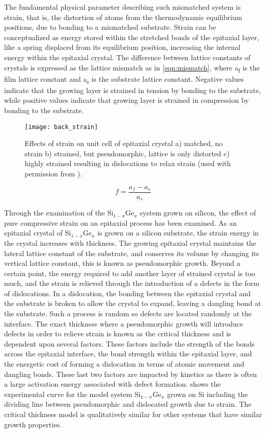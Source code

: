 The fundamental physical parameter describing such mismatched system is strain, that is, the distortion of atoms from the thermodynamic equilibrium positions, due to bonding to a mismatched substrate.
Strain can be conceptualized as energy stored within the stretched bonds of the epitaxial layer, like a spring displaced from its equilibrium position, increasing the internal energy within the epitaxial crystal. The difference between lattice constants of crystals is expressed as the lattice mismatch as in \cref{eqn:mismatch}, where a\textsubscript{f} is the film lattice constant and a\textsubscript{s} is the substrate lattice constant.
Negative values indicate that the growing layer is strained in tension by bonding to the substrate, while positive values indicate that growing layer is strained in compression by bonding to the substrate.
\begin{figure}
 \centering \texttt{[image: back\_strain]}
 \caption[Unit cell strain visualization]{\label{fig:back_strain}Effects of strain on unit cell of epitaxial crystal a) matched, no strain b) strained, but pseudomorphic, lattice is only distorted c) highly strained resulting in dislocations to relax strain (used with permission from \cite{ohring2001materials}).}
\end{figure}
\begin{equation}
    f = \frac{a_f - a_s}{a_s} \label{eqn:mismatch}
\end{equation}

Through the examination of the Si\(_{1-x}\)Ge\(_x\) system grown on silicon, the effect of pure compressive strain on an epitaxial process has been examined.
As an epitaxial crystal of Si\(_{1-x}\)Ge\(_x\) is grown on a silicon substrate, the strain energy in the crystal increases with thickness.
The growing epitaxial crystal maintains the lateral lattice constant of the substrate, and conserves its volume by changing its vertical lattice constant, this is known as pseudomorphic growth.
Beyond a certain point, the energy required to add another layer of strained crystal is too much, and the strain is relieved through the introduction of a defects in the form of dislocations.
In a dislocation, the bonding between the epitaxial crystal and the substrate is broken to allow the crystal to expand, leaving a dangling bond at the substrate.
Such a process is random so defects are located randomly at the interface.
The exact thickness where a pseudomorphic growth will introduce defects in order to relieve strain is known as the critical thickness and is dependent upon several factors.
These factors include the strength of the bonds across the epitaxial interface, the bond strength within the epitaxial layer, and the energetic cost of forming a dislocation in terms of atomic movement and dangling bonds.
These last two factors are impacted by kinetics as there is often a large activation energy associated with defect formation.
 shows the experimental curve for the model system Si\(_{1-x}\)Ge\(_x\) grown on Si including the dividing line between pseudomorphic and dislocated growth due to strain.
The critical thickness model is qualitatively similar for other systems that have similar growth properties.

